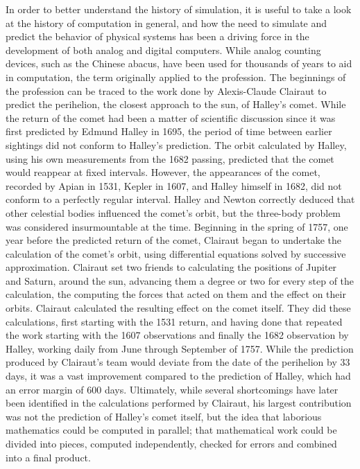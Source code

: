 In order to better understand the history of simulation, it is useful to take a look at the history of computation in general, and how the need to simulate and predict the behavior of physical systems
has been a driving force in the development of both analog and digital computers. While analog counting devices, such as the Chinese abacus, have been used for thousands of years to aid in
computation, the term originally applied to the profession. The beginnings of the profession can be traced to the work done by Alexis-Claude Clairaut to predict the perihelion, the closest approach to
the sun, of Halley's comet. While the return of the comet had been a matter of scientific discussion since it was first predicted by Edmund Halley in 1695, the period of time between earlier sightings
did not conform to Halley's prediction. The orbit calculated by Halley, using his own measurements from the 1682 passing, predicted that the comet would reappear at fixed intervals. However, the
appearances of the comet, recorded by Apian in 1531, Kepler in 1607, and Halley himself in 1682, did not conform to a perfectly regular interval. Halley and Newton correctly deduced that other
celestial bodies influenced the comet's orbit, but the three-body problem was considered insurmountable at the time. Beginning in the spring of 1757, one year before the predicted return of the comet,
Clairaut began to undertake the calculation of the comet's orbit, using differential equations solved by successive approximation\cite{wilson1993}. Clairaut set two friends to calculating the
positions of Jupiter and Saturn, around the sun, advancing them a degree or two for every step of the calculation, the computing the forces that acted on them and the effect on their orbits. Clairaut
calculated the resulting effect on the comet itself. They did these calculations, first starting with the 1531 return, and having done that repeated the work starting with the 1607 observations and
finally the 1682 observation by Halley, working daily from June through September of 1757. While the prediction produced by Clairaut's team would deviate from the date of the perihelion by 33 days, it
was a vast improvement compared to the prediction of Halley, which had an error margin of 600 days. Ultimately, while several shortcomings have later been identified in the calculations performed by
Clairaut, his largest contribution was not the prediction of Halley's comet itself, but the idea that laborious mathematics could be computed in parallel; that mathematical work could be divided into
pieces, computed independently, checked for errors and combined into a final product\cite{grier2010}.

